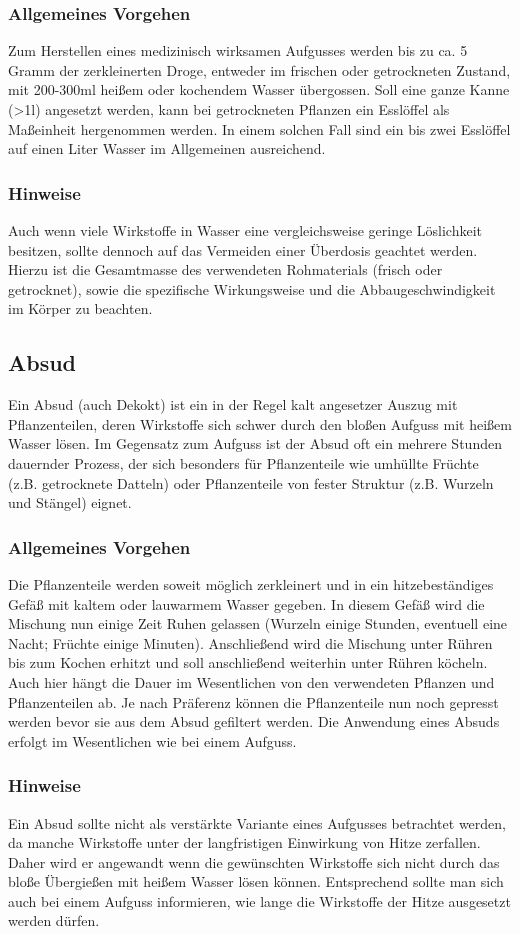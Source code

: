 \subsubsection{Allgemeines Vorgehen}
Zum Herstellen eines medizinisch wirksamen Aufgusses werden bis zu ca. 5 Gramm der zerkleinerten Droge, entweder im frischen oder getrockneten Zustand, mit 200-300ml heißem oder kochendem Wasser übergossen. Soll eine ganze Kanne (>1l) angesetzt werden, kann bei getrockneten Pflanzen ein Esslöffel als Maßeinheit hergenommen werden. In einem solchen Fall sind ein bis zwei Esslöffel auf einen Liter Wasser im Allgemeinen ausreichend.
\subsubsection{Hinweise}
Auch wenn viele Wirkstoffe in Wasser eine vergleichsweise geringe Löslichkeit besitzen, sollte dennoch auf das Vermeiden einer Überdosis geachtet werden. Hierzu ist die Gesamtmasse des verwendeten Rohmaterials (frisch oder getrocknet), sowie die spezifische Wirkungsweise und die Abbaugeschwindigkeit im Körper zu beachten.

\subsection{Absud}
Ein Absud (auch Dekokt) ist ein in der Regel kalt angesetzer Auszug mit Pflanzenteilen, deren Wirkstoffe sich schwer durch den bloßen Aufguss mit heißem Wasser lösen. Im Gegensatz zum Aufguss ist der Absud oft ein mehrere Stunden dauernder Prozess, der sich besonders für Pflanzenteile wie umhüllte Früchte (z.B. getrocknete Datteln) oder Pflanzenteile von fester Struktur (z.B. Wurzeln und Stängel) eignet.
\subsubsection{Allgemeines Vorgehen}
Die Pflanzenteile werden soweit möglich zerkleinert und in ein hitzebeständiges Gefäß mit kaltem oder lauwarmem Wasser gegeben. In diesem Gefäß wird die Mischung nun einige Zeit Ruhen gelassen (Wurzeln einige Stunden, eventuell eine Nacht; Früchte einige Minuten). Anschließend wird die Mischung unter Rühren bis zum Kochen erhitzt und soll anschließend weiterhin unter Rühren köcheln. Auch hier hängt die Dauer im Wesentlichen von den verwendeten Pflanzen und Pflanzenteilen ab. Je nach Präferenz können die Pflanzenteile nun noch gepresst werden bevor sie aus dem Absud gefiltert werden.
Die Anwendung eines Absuds erfolgt im Wesentlichen wie bei einem Aufguss.
\subsubsection{Hinweise}
Ein Absud sollte nicht als verstärkte Variante eines Aufgusses betrachtet werden, da manche Wirkstoffe unter der langfristigen Einwirkung von Hitze zerfallen. Daher wird er angewandt wenn die gewünschten Wirkstoffe sich nicht durch das bloße Übergießen mit heißem Wasser lösen können. Entsprechend sollte man sich auch bei einem Aufguss informieren, wie lange die Wirkstoffe der Hitze ausgesetzt werden dürfen.

						


						
						
																	